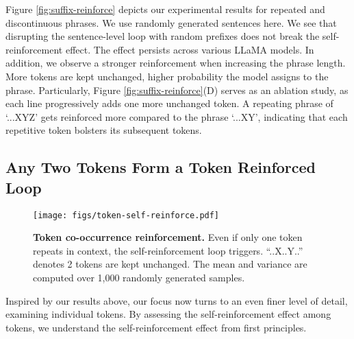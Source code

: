\documentclass{article} %
\begin{document}
Figure \ref{fig:suffix-reinforce} depicts our experimental results for repeated and discontinuous phrases. We use randomly generated sentences here. We see that disrupting the sentence-level loop with random prefixes does not break the self-reinforcement effect. 
The effect persists across various LLaMA models.
In addition, we observe a stronger reinforcement when increasing the phrase length. More tokens are kept unchanged, higher probability the model assigns to the phrase. 
Particularly, Figure \ref{fig:suffix-reinforce}(D) serves as an ablation study, as each line progressively adds one more unchanged token. 
A repeating phrase of `...XYZ' gets reinforced more compared to the phrase `...XY', indicating that each repetitive token bolsters its subsequent tokens.


\subsection{Any Two Tokens Form a Token Reinforced Loop}
\label{sec:token-reinforce}

\begin{figure}[t!]
  \centering
  \texttt{[image: figs/token-self-reinforce.pdf]}
  \vspace{-15pt}
  \caption{\textbf{Token co-occurrence reinforcement.} Even if only one token repeats in context, the self-reinforcement loop triggers. ``..X..Y..'' denotes 2 tokens are kept unchanged. The mean and variance are computed over 1,000 randomly generated samples. }
\label{fig:token-reinforce}
\vspace{-10pt}
\end{figure}

Inspired by our results above, our focus now turns to an even finer level of detail, examining individual tokens. By assessing the self-reinforcement effect among tokens, we understand the self-reinforcement effect from first principles. 
\end{document}
